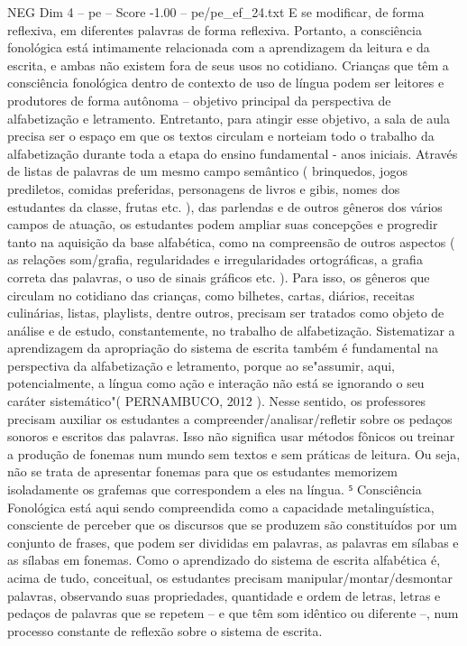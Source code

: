 \begin{textsample}{NEG Dim 4 – pe – Score -1.00 – pe/pe\_ef\_24.txt}
E se modificar, de forma reflexiva, em diferentes palavras de forma reflexiva.
Portanto, a consciência fonológica está intimamente relacionada com a aprendizagem da leitura e da escrita, e ambas não existem fora de seus usos no cotidiano.
Crianças que têm a consciência fonológica dentro de contexto de uso de língua podem ser leitores e produtores de forma autônoma – objetivo principal da perspectiva de alfabetização e letramento.
Entretanto, para atingir esse objetivo, a sala de aula precisa ser o espaço em que os textos circulam e norteiam todo o trabalho da alfabetização durante toda a etapa do ensino fundamental - anos iniciais.
Através de listas de palavras de um mesmo campo semântico ( brinquedos, jogos prediletos, comidas preferidas, personagens de livros e gibis, nomes dos estudantes da classe, frutas etc. ), das parlendas e de outros gêneros dos vários campos de atuação, os estudantes podem ampliar suas concepções e progredir tanto na aquisição da base alfabética, como na compreensão de outros aspectos ( as relações som/grafia, regularidades e irregularidades ortográficas, a grafia correta das palavras, o uso de sinais gráficos etc. ).
Para isso, os gêneros que circulam no cotidiano das crianças, como bilhetes, cartas, diários, receitas culinárias, listas, playlists, dentre outros, precisam ser tratados como objeto de análise e de estudo, constantemente, no trabalho de alfabetização.
Sistematizar a aprendizagem da apropriação do sistema de escrita também é fundamental na perspectiva da alfabetização e letramento, porque ao se"assumir, aqui, potencialmente, a língua como ação e interação não está se ignorando o seu caráter sistemático"( PERNAMBUCO, 2012 ).
Nesse sentido, os professores precisam auxiliar os estudantes a compreender/analisar/refletir sobre os pedaços sonoros e escritos das palavras.
Isso não significa usar métodos fônicos ou treinar a produção de fonemas num mundo sem textos e sem práticas de leitura.
Ou seja, não se trata de apresentar fonemas para que os estudantes memorizem isoladamente os grafemas que correspondem a eles na língua. ⁵ Consciência Fonológica está aqui sendo compreendida como a capacidade metalinguística, consciente de perceber que os discursos que se produzem são constituídos por um conjunto de frases, que podem ser divididas em palavras, as palavras em sílabas e as sílabas em fonemas.
Como o aprendizado do sistema de escrita alfabética é, acima de tudo, conceitual, os estudantes precisam manipular/montar/desmontar palavras, observando suas propriedades, quantidade e ordem de letras, letras e pedaços de palavras que se repetem – e que têm som idêntico ou diferente –, num processo constante de reflexão sobre o sistema de escrita.

\end{textsample}
